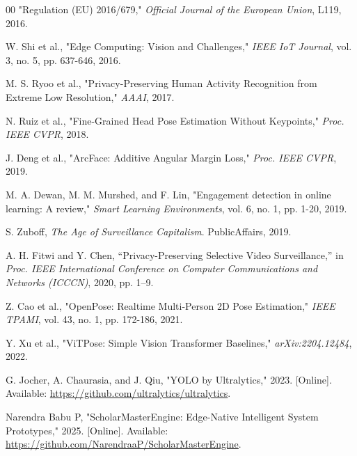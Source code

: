 \documentclass[conference]{IEEEtran}
\begin{document}
\begin{thebibliography}{00}
 "Regulation (EU) 2016/679," \textit{Official Journal of the European Union}, L119, 2016.

 W. Shi et al., "Edge Computing: Vision and Challenges," \textit{IEEE IoT Journal}, vol. 3, no. 5, pp. 637-646, 2016.

 M. S. Ryoo et al., "Privacy-Preserving Human Activity Recognition from Extreme Low Resolution," \textit{AAAI}, 2017.


 N. Ruiz et al., "Fine-Grained Head Pose Estimation Without Keypoints," \textit{Proc. IEEE CVPR}, 2018.

 J. Deng et al., "ArcFace: Additive Angular Margin Loss," \textit{Proc. IEEE CVPR}, 2019.


 M. A. Dewan, M. M. Murshed, and F. Lin, "Engagement detection in online learning: A review," \textit{Smart Learning Environments}, vol. 6, no. 1, pp. 1-20, 2019.

 S. Zuboff, \textit{The Age of Surveillance Capitalism}. PublicAffairs, 2019.

 A. H. Fitwi and Y. Chen, ``Privacy-Preserving Selective Video Surveillance,'' in \textit{Proc. IEEE International Conference on Computer Communications and Networks (ICCCN)}, 2020, pp. 1--9.

 Z. Cao et al., "OpenPose: Realtime Multi-Person 2D Pose Estimation," \textit{IEEE TPAMI}, vol. 43, no. 1, pp. 172-186, 2021.

 Y. Xu et al., "ViTPose: Simple Vision Transformer Baselines," \textit{arXiv:2204.12484}, 2022.

 G. Jocher, A. Chaurasia, and J. Qiu, "YOLO by Ultralytics," 2023. [Online]. Available: \url{https://github.com/ultralytics/ultralytics}.


 Narendra Babu P, "ScholarMasterEngine: Edge-Native Intelligent System Prototypes," 2025. [Online]. Available: \url{https://github.com/NarendraaP/ScholarMasterEngine}.

\end{thebibliography}
\end{document}
